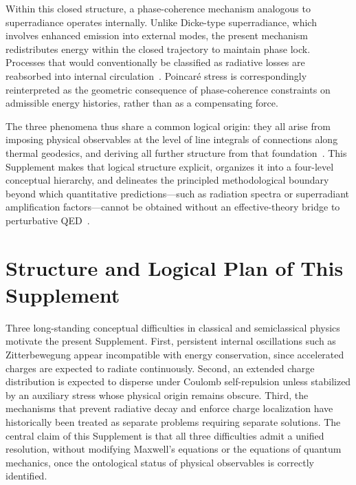 \documentclass[12pt,a4paper]{article}
\begin{document}
Within this closed structure, a phase-coherence mechanism analogous to superradiance operates internally. Unlike Dicke-type superradiance, which involves enhanced emission into external modes, the present mechanism redistributes energy within the closed trajectory to maintain phase lock. Processes that would conventionally be classified as radiative losses are reabsorbed into internal circulation~\cite{hanamura18437010}. Poincar\'e stress is correspondingly reinterpreted as the geometric consequence of phase-coherence constraints on admissible energy histories, rather than as a compensating force.

The three phenomena thus share a common logical origin: they all arise from imposing physical observables at the level of line integrals of connections along thermal geodesics, and deriving all further structure from that foundation~\cite{hanamura18203433}. This Supplement makes that logical structure explicit, organizes it into a four-level conceptual hierarchy, and delineates the principled methodological boundary beyond which quantitative predictions---such as radiation spectra or superradiant amplification factors---cannot be obtained without an effective-theory bridge to perturbative QED~\cite{hanamura18603340}.

\clearpage

\section{Structure and Logical Plan of This Supplement}

\justifying

Three long-standing conceptual difficulties in classical and semiclassical physics motivate the present Supplement. First, persistent internal oscillations such as Zitterbewegung appear incompatible with energy conservation, since accelerated charges are expected to radiate continuously. Second, an extended charge distribution is expected to disperse under Coulomb self-repulsion unless stabilized by an auxiliary stress whose physical origin remains obscure. Third, the mechanisms that prevent radiative decay and enforce charge localization have historically been treated as separate problems requiring separate solutions. The central claim of this Supplement is that all three difficulties admit a unified resolution, without modifying Maxwell's equations or the equations of quantum mechanics, once the ontological status of physical observables is correctly identified.
\end{document}
